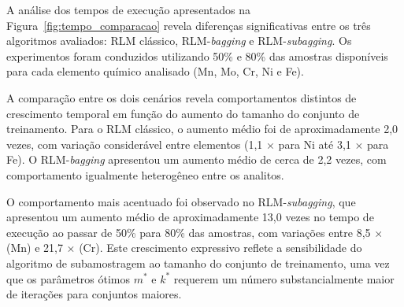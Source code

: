 \begin{figure}[htbp]
\begin{minipage}{0.48\textwidth}
{
}%
\end{minipage}

\end{figure}



A análise dos tempos de execução apresentados na Figura~\ref{fig:tempo_comparacao} 
revela diferenças significativas entre os três algoritmos avaliados: RLM clássico, 
RLM-\textit{bagging} e RLM-\textit{subagging}. Os experimentos foram conduzidos 
utilizando 50\% e 80\% das amostras disponíveis para cada elemento químico 
analisado (Mn, Mo, Cr, Ni e Fe).

A comparação entre os dois cenários revela comportamentos distintos de crescimento temporal em função do aumento do tamanho do conjunto de treinamento. Para o RLM clássico, o aumento médio foi de aproximadamente 2,0 vezes, com variação 
considerável entre elementos (1,1 $\times$ para Ni até 3,1 $\times$ para Fe). O 
RLM-\textit{bagging} apresentou um aumento médio de cerca de 2,2 vezes, com 
comportamento igualmente heterogêneo entre os analitos.

O comportamento mais acentuado foi observado no RLM-\textit{subagging}, que 
apresentou um aumento médio de aproximadamente 13,0 vezes no tempo de execução 
ao passar de 50\% para 80\% das amostras, com variações entre 8,5 $\times$ (Mn) e 
21,7 $\times$ (Cr). Este crescimento expressivo reflete a sensibilidade do algoritmo 
de subamostragem ao tamanho do conjunto de treinamento, uma vez que os 
parâmetros ótimos $m^*$ e $k^*$ requerem um número substancialmente maior de 
iterações para conjuntos maiores.

